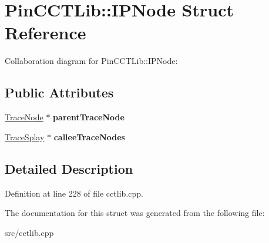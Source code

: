 \hypertarget{structPinCCTLib_1_1IPNode}{\section{Pin\-C\-C\-T\-Lib\-:\-:I\-P\-Node Struct Reference}
\label{structPinCCTLib_1_1IPNode}
}


Collaboration diagram for Pin\-C\-C\-T\-Lib\-:\-:I\-P\-Node\-:
\subsection*{Public Attributes}
\begin{DoxyCompactItemize}
\item 
\hypertarget{structPinCCTLib_1_1IPNode_a5911e698dc53a7262966601a56525bde}{\hyperlink{structPinCCTLib_1_1TraceNode}{Trace\-Node} $\ast$ {\bfseries parent\-Trace\-Node}}\label{structPinCCTLib_1_1IPNode_a5911e698dc53a7262966601a56525bde}

\item 
\hypertarget{structPinCCTLib_1_1IPNode_a666b3581aca41a0dbd16ed0eff87e50c}{\hyperlink{structPinCCTLib_1_1TraceSplay}{Trace\-Splay} $\ast$ {\bfseries callee\-Trace\-Nodes}}\label{structPinCCTLib_1_1IPNode_a666b3581aca41a0dbd16ed0eff87e50c}

\end{DoxyCompactItemize}


\subsection{Detailed Description}


Definition at line 228 of file cctlib.\-cpp.



The documentation for this struct was generated from the following file\-:\begin{DoxyCompactItemize}
\item 
src/cctlib.\-cpp\end{DoxyCompactItemize}
